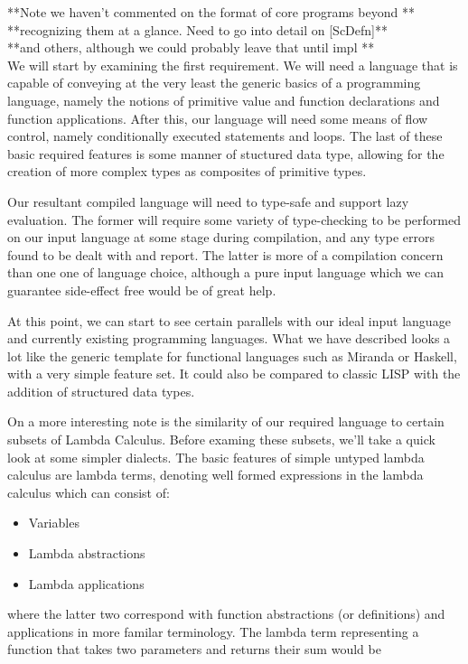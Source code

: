 \documentclass[11pt]{article}
\begin{document}
**Note we haven't commented on the format of core programs beyond **\\
**recognizing them at a glance. Need to go into detail on [ScDefn]**\\
**and others, although we could probably leave that until impl	  **\\

\noindent We will start by examining the first requirement. We will need a
language that is capable of conveying at the very least the generic basics of a programming language, namely the notions of primitive value and function
declarations and function applications. After this, our language will need
some means of flow control, namely conditionally executed statements and 
loops. The last of these basic required features is some manner of stuctured
data type, allowing for the creation of more complex types as composites of
primitive types. 

Our resultant compiled language will need to type-safe and support lazy
evaluation. The former will require some variety of type-checking to be 
performed on our input language at some stage during compilation, and any
type errors found to be dealt with and report. The latter is more of a 
compilation concern than one one of language choice, although a pure input
language which we can guarantee side-effect free would be of great help.

At this point, we can start to see certain parallels with our ideal input
language and currently existing programming languages. What we have described
looks a lot like the generic template for functional languages such as Miranda
or Haskell, with a very simple feature set. It could also be compared to 
classic LISP with the addition of structured data types. 

On a more interesting note is the similarity of our required language to
certain subsets of Lambda Calculus. Before examing these subsets, we'll
take a quick look at some simpler dialects. The basic
features of simple untyped lambda calculus are lambda terms, denoting well formed expressions in the lambda calculus which can consist of:

\begin{itemize}
\item Variables
\item Lambda abstractions
\item Lambda applications
\end{itemize}

\noindent where the latter two correspond with function abstractions (or
definitions) and applications in more familar terminology. The lambda term
representing a function that takes two parameters and returns their sum 
would be 
\end{document}
